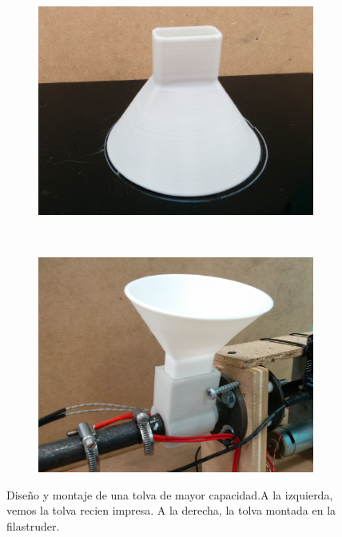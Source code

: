 \begin{figure}[H]
    \centering
    \begin{subfigure}[b]{0.45\textwidth}
        \centering
        \includegraphics[width=\linewidth]{images/producciones/20072015/IMG_20150721_121831.jpg}
        \label{fig:tolva-impresa}
    \end{subfigure}
    ~
    \begin{subfigure}[b]{0.45\textwidth}
            \centering
        \includegraphics[width=\linewidth]{images/producciones/20072015/IMG_20150721_121904.jpg}
        \label{fig:tolva-montada}
    \end{subfigure}
    \caption[Diseño y montaje de una tolva de mayor capacidad.]{Diseño y montaje de una tolva de mayor capacidad.A la izquierda, vemos la tolva recien impresa. A la derecha, la tolva montada en la filastruder.}
    \label{fig:tolv_montaj}
\end{figure}

